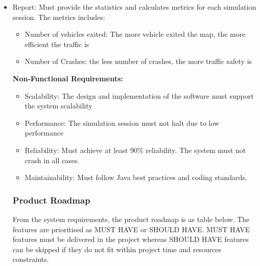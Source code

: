 \documentclass[11pt]{article}
\begin{document}
{\begin{itemize}
\begin{itemize}
\begin{itemize}
        \item Check the traffic context to make decision whether vehicles go straight, turn right, turn left, 3-point turn, increase speed, reduce speed or stop
        \end{itemize}
        
        
       
        \item Report: Must provide the statistics and calculates     metrics  for each simulation session. The metrics includes:
        \begin{itemize}
        \item Number of vehicles exited: The more vehicle exited the map, the more efficient the traffic is 
        \item Number of Crashes: the less number of crashes, the more traffic safety is
        
        \end{itemize}
        

    
    {\bf{Non-Functional Requirements:}} 
    \begin{itemize}
    \item Scalability: The design and implementation of the software must support the system scalability
    
    \item Performance: The simulation session must not halt due to low performance
    
    \item Reliability: Must achieve at least 90\% reliability. The system must not crash in all cases.
    
    \item Maintainability: Must follow Java best practices and coding standards. 
    
    \end{itemize}
   
      \subsubsection{Product Roadmap}
  From the system requirements, the product roadmap is as table below. The features are prioritised as MUST HAVE or SHOULD HAVE. MUST HAVE features must be delivered in the project whereas SHOULD HAVE features can be skipped if they do not fit within project time and resources  constraints.
  
      \begin{table}[H]
       

\end{table}
\end{itemize}
\end{itemize}}
\end{document}

